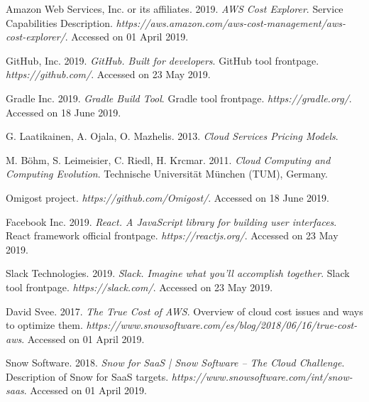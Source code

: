 \documentclass[licencjacka,en]{thesisclass}
\begin{document}
\begin{thebibliography}{99}
        Amazon Web Services, Inc. or its affiliates. 2019.
        \textit{AWS Cost Explorer}.
        Service Capabilities Description.
        \textit{https://aws.amazon.com/aws-cost-management/aws-cost-explorer/}.
        Accessed on 01 April 2019.

        GitHub, Inc. 2019.
        \textit{GitHub. Built for developers}.
        GitHub tool frontpage.
        \textit{https://github.com/}.
        Accessed on 23 May 2019.

        Gradle Inc. 2019.
        \textit{Gradle Build Tool}.
        Gradle tool frontpage.
        \textit{https://gradle.org/}.
        Accessed on 18 June 2019.

        G. Laatikainen, A. Ojala, O. Mazhelis. 2013.
        \textit{Cloud Services Pricing Models}.

        M. Böhm, S. Leimeisier, C. Riedl, H. Krcmar. 2011.
        \textit{Cloud Computing and Computing Evolution}.
        Technische Universität München (TUM), Germany.

        Omigost project.
        \textit{https://github.com/Omigost/}.
        Accessed on 18 June 2019.

        Facebook Inc. 2019.
        \textit{React. A JavaScript library for building user interfaces}.
        React framework official frontpage.
        \textit{https://reactjs.org/}.
        Accessed on 23 May 2019.

        Slack Technologies. 2019.
        \textit{Slack. Imagine what you’ll accomplish together}.
        Slack tool frontpage.
        \textit{https://slack.com/}.
        Accessed on 23 May 2019.

        David Svee. 2017.
        \textit{The True Cost of AWS}.
        Overview of cloud cost issues and ways to optimize them.
        \textit{https://www.snowsoftware.com/es/blog/2018/06/16/true-cost-aws}.
        Accessed on 01 April 2019.

        Snow Software. 2018.
        \textit{Snow for SaaS | Snow Software -- The Cloud Challenge}.
        Description of Snow for SaaS targets.
        \textit{https://www.snowsoftware.com/int/snow-saas}.
        Accessed on 01 April 2019.


\end{thebibliography}
\end{document}
